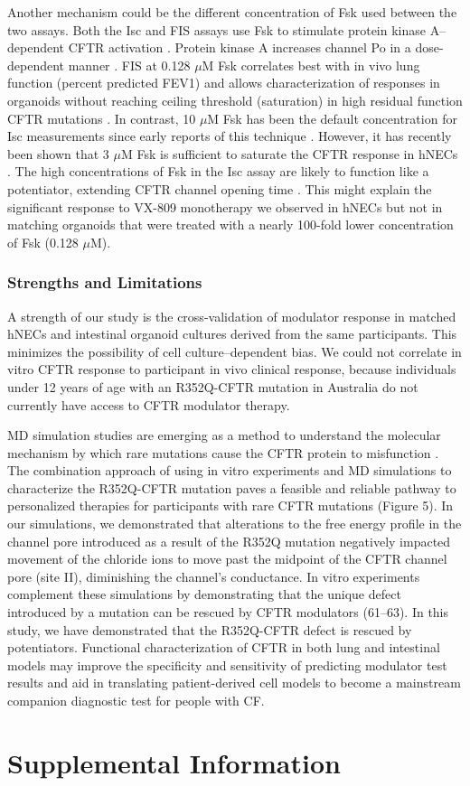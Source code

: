 Another mechanism could be the different concentration of Fsk used between the two assays. Both the Isc and FIS assays use Fsk to stimulate protein kinase A–dependent CFTR activation \cite{dekkers2013, gentzsch2017}. Protein kinase A increases channel Po in a dose-dependent manner \cite{cui2019}. FIS at 0.128 $\mu$M Fsk correlates best with in vivo lung function (percent predicted FEV1) and allows characterization of responses in organoids without reaching ceiling threshold (saturation) in high residual function CFTR mutations \cite{dekkers2016}. In contrast, 10 $\mu$M Fsk has been the default concentration for Isc measurements since early reports of this technique \cite{blouquit2002, smith1993}. However, it has recently been shown that 3 $\mu$M Fsk is sufficient to saturate the CFTR response in hNECs \cite{avramescu2017}. The high concentrations of Fsk in the Isc assay are likely to function like a potentiator, extending CFTR channel opening time \cite{cui2019}. This might explain the significant response to VX-809 monotherapy we observed in hNECs but not in matching organoids that were treated with a nearly 100-fold lower concentration of Fsk (0.128 $\mu$M).

\subsubsection{Strengths and Limitations}

A strength of our study is the cross-validation of modulator response in matched hNECs and intestinal organoid cultures derived from the same participants. This minimizes the possibility of cell culture–dependent bias. We could not correlate in vitro CFTR response to participant in vivo clinical response, because individuals under 12 years of age with an R352Q-CFTR mutation in Australia do not currently have access to CFTR modulator therapy.

MD simulation studies are emerging as a method to understand the molecular mechanism by which rare mutations cause the CFTR protein to misfunction \cite{callebaut2017}. The combination approach of using in vitro experiments and MD simulations to characterize the R352Q-CFTR mutation paves a feasible and reliable pathway to personalized therapies for participants with rare CFTR mutations (Figure 5). In our simulations, we demonstrated that alterations to the free energy profile in the channel pore introduced as a result of the R352Q mutation negatively impacted movement of the chloride ions to move past the midpoint of the CFTR channel pore (site II), diminishing the channel’s conductance. In vitro experiments complement these simulations by demonstrating that the unique defect introduced by a mutation can be rescued by CFTR modulators (61–63). In this study, we have demonstrated that the R352Q-CFTR defect is rescued by potentiators. Functional characterization of CFTR in both lung and intestinal models may improve the specificity and sensitivity of predicting modulator test results and aid in translating patient-derived cell models to become a mainstream companion diagnostic test for people with CF.

\section{Supplemental Information}

